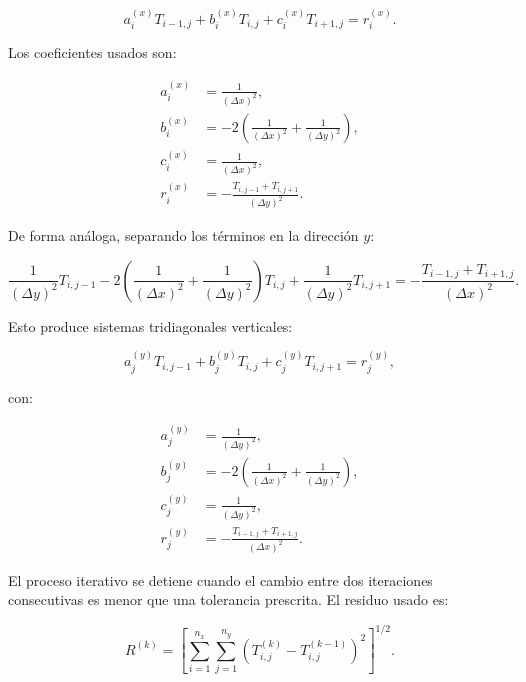 \documentclass[11pt,a4paper]{article}
\begin{document}
\begin{equation}
a_i^{(x)}T_{i-1,j}+b_i^{(x)}T_{i,j}+c_i^{(x)}T_{i+1,j}=r_i^{(x)}.
\end{equation}

Los coeficientes usados son:

\begin{align}
a_i^{(x)} &= \frac{1}{(\Delta x)^2}, \label{eq:coef_tridiagonal_x_2D_a} \\
b_i^{(x)} &= -2\left(\frac{1}{(\Delta x)^2}+\frac{1}{(\Delta y)^2}\right), \label{eq:coef_tridiagonal_x_2D_b} \\
c_i^{(x)} &= \frac{1}{(\Delta x)^2}, \label{eq:coef_tridiagonal_x_2D_c} \\
r_i^{(x)} &= -\frac{T_{i,j-1}+T_{i,j+1}}{(\Delta y)^2}.
\label{eq:coef_tridiagonal_x_2D_r}
\end{align}

De forma an\'aloga, separando los t\'erminos en la direcci\'on $y$:

\begin{equation}
\frac{1}{(\Delta y)^2}T_{i,j-1}
-2\left(\frac{1}{(\Delta x)^2}+\frac{1}{(\Delta y)^2}\right)T_{i,j}
+\frac{1}{(\Delta y)^2}T_{i,j+1}
=-\frac{T_{i-1,j}+T_{i+1,j}}{(\Delta x)^2}.
\end{equation}

Esto produce sistemas tridiagonales verticales:

\begin{equation}
a_j^{(y)}T_{i,j-1}+b_j^{(y)}T_{i,j}+c_j^{(y)}T_{i,j+1}=r_j^{(y)},
\end{equation}

con:

\begin{align}
a_j^{(y)} &= \frac{1}{(\Delta y)^2}, \label{eq:coef_tridiagonal_y_2D_a} \\
b_j^{(y)} &= -2\left(\frac{1}{(\Delta x)^2}+\frac{1}{(\Delta y)^2}\right), \label{eq:coef_tridiagonal_y_2D_b} \\
c_j^{(y)} &= \frac{1}{(\Delta y)^2}, \label{eq:coef_tridiagonal_y_2D_c} \\
r_j^{(y)} &= -\frac{T_{i-1,j}+T_{i+1,j}}{(\Delta x)^2}.
\label{eq:coef_tridiagonal_y_2D_r}
\end{align}

El proceso iterativo se detiene cuando el cambio entre dos iteraciones
consecutivas es menor que una tolerancia prescrita. El residuo usado es:

\begin{equation}
R^{(k)}=
\left[
\sum_{i=1}^{n_x}\sum_{j=1}^{n_y}
\left(T_{i,j}^{(k)}-T_{i,j}^{(k-1)}\right)^2
\right]^{1/2}.
\end{equation}
\end{document}
